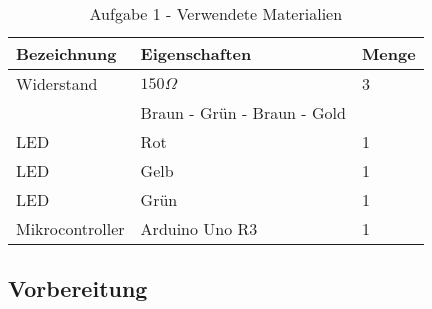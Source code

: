 \documentclass[11pt]{article}
\begin{document}
    \begin{table}[h]
        \centering
        \caption{Aufgabe 1 - Verwendete Materialien}
        \label{tab:a1-materialien}
        \begin{tabular}{| l | l | l |}
            \hline
            Bezeichnung & Eigenschaften & Menge \\
            \hline
            Widerstand  & $150\Omega$   & 3     \\
                        & Braun - Grün - Braun - Gold & \\
            LED & Rot & 1 \\
            LED & Gelb & 1 \\
            LED & Grün & 1 \\
            Mikrocontroller & Arduino Uno R3 & 1 \\
            \hline
        \end{tabular}
    \end{table}

    \subsection{Vorbereitung}
    \label{subsec:A1-vorbereitung}

    \printbibliography
\end{document}
